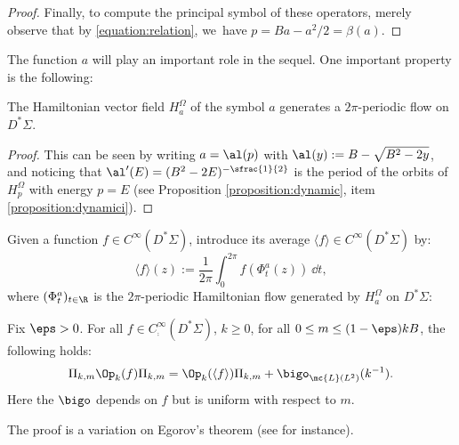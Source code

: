 \begin{proof}
Finally, to compute the principal symbol of these operators, merely observe
that by \eqref{equation:relation}, we~have $p = B a - a^2/2 = \beta(a)$.
\end{proof}

The function $a$ will play an important role in the sequel. One important property is the following:

\begin{lemma}
\label{lemma:2pi-periodic}
The Hamiltonian vector field $H_a^\Omega$ of the symbol $a$ generates a $2 \pi$\nobreakdash-peri\-odic flow on $D^*\Sigma$.
\end{lemma}

\begin{proof}This can be seen by writing $a = \al (p)$ with $\al(y) := B - \sqrt{ B^2 - 2 y }$, and noticing
that $\al' (E) = (B^2 - 2 E)^{-\sfrac{1}{2}}$ is the period of the orbits of $H_p^\Omega$
with energy $p =E$ (see Proposition \ref{proposition:dynamic}, item \eqref{proposition:dynamici}).
\end{proof}

Given a function $f \in C^\infty (D^*\Sigma)$, introduce its average
$\langle f \rangle \in C^\infty (D^*\Sigma)$ by:
\begin{equation}
\label{equation:average}
\langle f \rangle (z) := \frac{1}{2\pi} \int_0^{2 \pi} f (\Phi_t^a (z)) ~\dd t,
\end{equation}
where $(\Phi_t^a)_{t \in \R}$ is the $2\pi$-periodic Hamiltonian flow generated by $H_a^\Omega$ on $D^*\Sigma$:

\begin{lemma} \label{lem:commutateur_espace_propre}
Fix $\eps > 0$. For all $f \in C^\infty_{{\comp}} (D^*\Sigma)$, $k \geq 0$, for all $0 \leq m \leq (1-\eps)kB$, the following holds:
\[
\Pi_{k,m}\Op_{k}(f) \Pi_{k,m} = \Op_{k}(\langle f \rangle)
\Pi_{k,m} + \bigo_{\mc{L}(L^2)}(k^{-1}).
\]
Here the $\bigo $ depends on $f$ but is uniform with respect to $m$.
\end{lemma}

The proof is a variation on Egorov's theorem (see \cite[Th.\,15.2]{Zworski-12} for instance).

